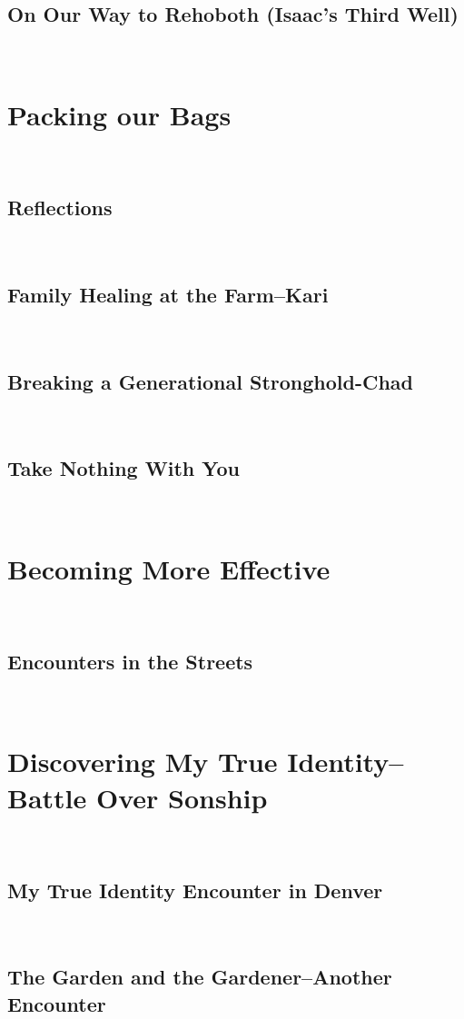 \documentclass[oneside]{book}
\begin{document}
\section{On Our Way to Rehoboth (Isaac's Third Well)}
\

\chapter{Packing our Bags}
\

\section{Reflections}
\

\section{Family Healing at the Farm--Kari}
\

\section{Breaking a Generational Stronghold-Chad}
\

\section{Take Nothing With You}
\

\chapter{Becoming More Effective}
\

\section{Encounters in the Streets}
\

\chapter{Discovering My True Identity--Battle Over Sonship}
\

\section{My True Identity Encounter in Denver}
\

\section{The Garden and the Gardener--Another Encounter}
\
\end{document}
